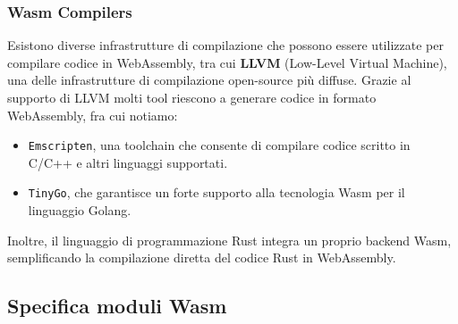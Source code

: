 \subsubsection{Wasm Compilers}

Esistono diverse infrastrutture di compilazione che possono essere utilizzate per compilare codice in WebAssembly, tra cui \textbf{LLVM} (Low-Level Virtual Machine), una delle infrastrutture di compilazione open-source più diffuse. Grazie al supporto di LLVM molti tool riescono a generare codice in formato WebAssembly, fra cui notiamo:
\begin{itemize}
    \item \texttt{Emscripten}\cite{Jiang2017Quick}, una toolchain che consente di compilare codice scritto in C/C++ e altri linguaggi supportati.
    \item \texttt{TinyGo}\cite{Plauska2022Performance}, che garantisce un forte supporto alla tecnologia Wasm per il linguaggio Golang.
\end{itemize}
Inoltre, il linguaggio di programmazione Rust integra un proprio backend Wasm, semplificando la compilazione diretta del codice Rust in WebAssembly.


\subsection{Specifica moduli Wasm}

